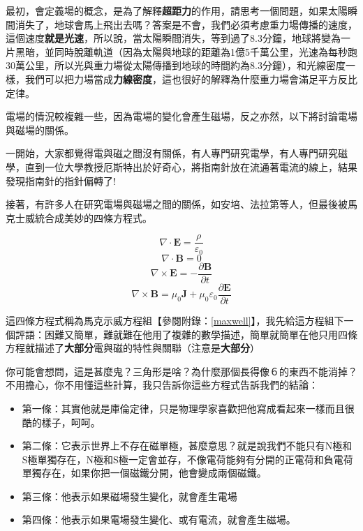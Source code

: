 \begin{tcolorbox}[breakable, title={專欄：平方反比定律}, before upper={\parindent2em}, parbox=false]
最初，會定義場的概念，是為了解釋\textbf{超距力}的作用，請思考一個問題，如果太陽瞬間消失了，地球會馬上飛出去嗎？答案是不會，我們必須考慮重力場傳播的速度，這個速度\textbf{就是光速}，所以說，當太陽瞬間消失，等到過了8.3分鐘，地球將變為一片黑暗，並同時脫離軌道（因為太陽與地球的距離為1億5千萬公里，光速為每秒跑30萬公里，所以光與重力場從太陽傳播到地球的時間約為8.3分鐘），和光線密度一樣，我們可以把力場當成\textbf{力線密度}，這也很好的解釋為什麼重力場會滿足平方反比定律。

電場的情況較複雜一些，因為電場的變化會產生磁場，反之亦然，以下將討論電場與磁場的關係。
\end{tcolorbox}

一開始，大家都覺得電與磁之間沒有關係，有人專門研究電學，有人專門研究磁學，直到一位大學教授厄斯特出於好奇心，將指南針放在流通著電流的線上，結果發現指南針的指針偏轉了!

接著，有許多人在研究電場與磁場之間的關係，如安培、法拉第等人，但最後被馬克士威統合成美妙的四條方程式。

$$ \nabla \cdot \mathbf{E}=\frac{\rho}{\varepsilon_{0}} $$
$$ \nabla \cdot \mathbf{B}=0 $$
$$ \nabla \times \mathbf{E}=-\frac{\partial \mathbf{B}}{\partial t} $$
$$ \nabla \times \mathbf{B}=\mu_{0} \mathbf{J}+\mu_{0} \varepsilon_{0} \frac{\partial \mathbf{E}}{\partial t} $$

\begingroup
{}
\endgroup

這四條方程式稱為馬克示威方程組【參閱附錄：\autoref{maxwell}】，我先給這方程組下一個評語：困難又簡單，難就難在他用了複雜的數學描述，簡單就簡單在他只用四條方程就描述了\textbf{大部分}電與磁的特性與關聯（注意是\textbf{大部分}） \par

你可能會想問，這是甚麼鬼？三角形是啥？為什麼那個長得像６的東西不能消掉？不用擔心，你不用懂這些計算，我只告訴你這些方程式告訴我們的結論：

\begin{itemize}
\item 第一條：其實他就是庫倫定律，只是物理學家喜歡把他寫成看起來一樣而且很酷的樣子，呵呵。
\item 第二條：它表示世界上不存在磁單極，甚麼意思？就是說我們不能只有N極和S極單獨存在，N極和S極一定會並存，不像電荷能夠有分開的正電荷和負電荷單獨存在，如果你把一個磁鐵分開，他會變成兩個磁鐵。
\item 第三條：他表示如果磁場發生變化，就會產生電場
\item 第四條：他表示如果電場發生變化、或有電流，就會產生磁場。
\end{itemize}

